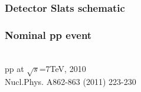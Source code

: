 \documentclass{beamer}
\begin{document}
\begin{frame}
\frametitle{Detector Slats schematic}
\end{frame}


\begin{frame}
  \frametitle{Nominal pp event}
 \\
pp at $\sqrt{s}$=7TeV, 2010 \\
Nucl.Phys. A862-863 (2011) 223-230
\end{frame}
\end{document}
